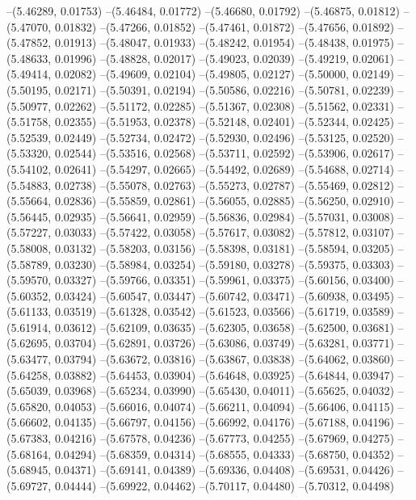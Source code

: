 --(5.46289, 0.01753)
--(5.46484, 0.01772)
--(5.46680, 0.01792)
--(5.46875, 0.01812)
--(5.47070, 0.01832)
--(5.47266, 0.01852)
--(5.47461, 0.01872)
--(5.47656, 0.01892)
--(5.47852, 0.01913)
--(5.48047, 0.01933)
--(5.48242, 0.01954)
--(5.48438, 0.01975)
--(5.48633, 0.01996)
--(5.48828, 0.02017)
--(5.49023, 0.02039)
--(5.49219, 0.02061)
--(5.49414, 0.02082)
--(5.49609, 0.02104)
--(5.49805, 0.02127)
--(5.50000, 0.02149)
--(5.50195, 0.02171)
--(5.50391, 0.02194)
--(5.50586, 0.02216)
--(5.50781, 0.02239)
--(5.50977, 0.02262)
--(5.51172, 0.02285)
--(5.51367, 0.02308)
--(5.51562, 0.02331)
--(5.51758, 0.02355)
--(5.51953, 0.02378)
--(5.52148, 0.02401)
--(5.52344, 0.02425)
--(5.52539, 0.02449)
--(5.52734, 0.02472)
--(5.52930, 0.02496)
--(5.53125, 0.02520)
--(5.53320, 0.02544)
--(5.53516, 0.02568)
--(5.53711, 0.02592)
--(5.53906, 0.02617)
--(5.54102, 0.02641)
--(5.54297, 0.02665)
--(5.54492, 0.02689)
--(5.54688, 0.02714)
--(5.54883, 0.02738)
--(5.55078, 0.02763)
--(5.55273, 0.02787)
--(5.55469, 0.02812)
--(5.55664, 0.02836)
--(5.55859, 0.02861)
--(5.56055, 0.02885)
--(5.56250, 0.02910)
--(5.56445, 0.02935)
--(5.56641, 0.02959)
--(5.56836, 0.02984)
--(5.57031, 0.03008)
--(5.57227, 0.03033)
--(5.57422, 0.03058)
--(5.57617, 0.03082)
--(5.57812, 0.03107)
--(5.58008, 0.03132)
--(5.58203, 0.03156)
--(5.58398, 0.03181)
--(5.58594, 0.03205)
--(5.58789, 0.03230)
--(5.58984, 0.03254)
--(5.59180, 0.03278)
--(5.59375, 0.03303)
--(5.59570, 0.03327)
--(5.59766, 0.03351)
--(5.59961, 0.03375)
--(5.60156, 0.03400)
--(5.60352, 0.03424)
--(5.60547, 0.03447)
--(5.60742, 0.03471)
--(5.60938, 0.03495)
--(5.61133, 0.03519)
--(5.61328, 0.03542)
--(5.61523, 0.03566)
--(5.61719, 0.03589)
--(5.61914, 0.03612)
--(5.62109, 0.03635)
--(5.62305, 0.03658)
--(5.62500, 0.03681)
--(5.62695, 0.03704)
--(5.62891, 0.03726)
--(5.63086, 0.03749)
--(5.63281, 0.03771)
--(5.63477, 0.03794)
--(5.63672, 0.03816)
--(5.63867, 0.03838)
--(5.64062, 0.03860)
--(5.64258, 0.03882)
--(5.64453, 0.03904)
--(5.64648, 0.03925)
--(5.64844, 0.03947)
--(5.65039, 0.03968)
--(5.65234, 0.03990)
--(5.65430, 0.04011)
--(5.65625, 0.04032)
--(5.65820, 0.04053)
--(5.66016, 0.04074)
--(5.66211, 0.04094)
--(5.66406, 0.04115)
--(5.66602, 0.04135)
--(5.66797, 0.04156)
--(5.66992, 0.04176)
--(5.67188, 0.04196)
--(5.67383, 0.04216)
--(5.67578, 0.04236)
--(5.67773, 0.04255)
--(5.67969, 0.04275)
--(5.68164, 0.04294)
--(5.68359, 0.04314)
--(5.68555, 0.04333)
--(5.68750, 0.04352)
--(5.68945, 0.04371)
--(5.69141, 0.04389)
--(5.69336, 0.04408)
--(5.69531, 0.04426)
--(5.69727, 0.04444)
--(5.69922, 0.04462)
--(5.70117, 0.04480)
--(5.70312, 0.04498)

